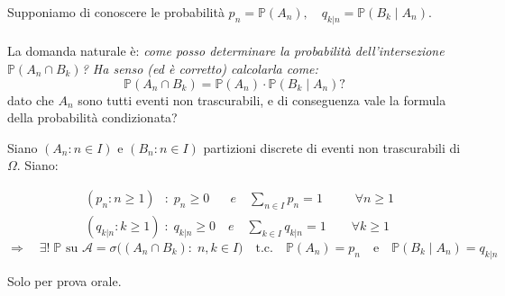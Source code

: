 \begin{center}
\end{center}
Supponiamo di conoscere le probabilità
\(p_n = \mathbb{P}(A_n), \quad q_{k|n} = \mathbb{P}(B_k \mid A_n).\)\\
\\
La domanda naturale è: \textit{come posso determinare la probabilità dell’intersezione $\mathbb{P}(A_n \cap B_k)$? Ha senso (ed è corretto) calcolarla come:}
\[
\mathbb{P}(A_n \cap B_k) = \mathbb{P}(A_n) \cdot \mathbb{P}(B_k \mid A_n)?
\]
dato che $A_n$ sono tutti eventi non trascurabili, e di conseguenza vale la formula della probabilità condizionata?

\begin{teorema}
    Siano $(A_n : n \in I)$ e $(B_n : n \in I)$ partizioni discrete di eventi non trascurabili di $\Omega$. Siano:
    
    \begin{align*}
        &(p_n:n\geq1)\:\:\;:\;p_n\geq0\quad \:\:\:e \quad \sum_{n\in I}p_n = 1 \qquad \;\;\forall n\geq1 \\
        &(q_{k|n}:k\geq1)\;:\;q_{k|n}\geq0\quad e \quad \sum_{k\in I}q_{k|n} = 1 \qquad \forall k\geq1
    \end{align*}
    \[\Rightarrow\quad \exists!\; \mathbb{P} \text{ su } \mathcal{A} = \sigma\Big((A_n\cap B_k):\;n, k\in I\Big) \quad \text{t.c.} \quad
    \mathbb{P}(A_n) = p_n\quad  \text{e}\quad \mathbb{P}(B_k\mid A_n) = q_{k|n} \]
    \begin{dimostrazione}
        Solo per prova orale.
    \end{dimostrazione}
\end{teorema}

